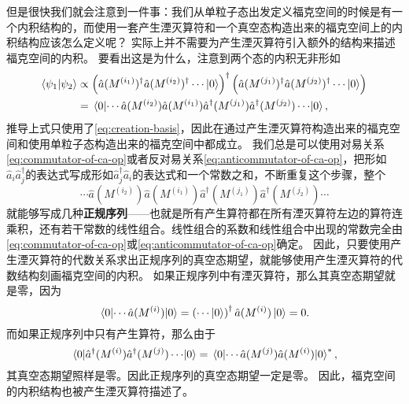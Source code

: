 \documentclass[hyperref, UTF8, a4paper]{ctexart}
\begin{document}
但是很快我们就会注意到一件事：我们从单粒子态出发定义福克空间的时候是有一个内积结构的，而使用一套产生湮灭算符和一个真空态构造出来的福克空间上的内积结构应该怎么定义呢？
实际上并不需要为产生湮灭算符引入额外的结构来描述福克空间的内积。
要看出这是为什么，注意到两个态的内积无非形如
\[
    \begin{aligned}
        \braket{\psi_1}{\psi_2} &\propto \left( \hat{a}(M^{(i_1)})^\dagger \hat{a}(M^{(i_2)})^\dagger \cdots \ket{0} \right)^\dagger \left( \hat{a}(M^{(j_1)})^\dagger \hat{a}(M^{(j_2)})^\dagger \cdots \ket{0} \right) \\
        &= \mel{0}{\cdots \hat{a}(M^{(i_2)}) \hat{a}(M^{(i_1)}) \hat{a}^\dagger(M^{(j_1)}) \hat{a}^\dagger (M^{(j_2)}) \cdots }{0},
    \end{aligned}
\]
推导上式只使用了\eqref{eq:creation-basis}，因此在通过产生湮灭算符构造出来的福克空间和使用单粒子态构造出来的福克空间中都成立。
我们总是可以使用对易关系\eqref{eq:commutator-of-ca-op}或者反对易关系\eqref{eq:anticommutator-of-ca-op}，把形如$\hat{a}_i \hat{a}^\dagger_j$的表达式写成形如$\hat{a}^\dagger_j \hat{a}_i$的表达式和一个常数之和，不断重复这个步骤，整个
\[
    \cdots \hat{a}(M^{(i_2)}) \hat{a}(M^{(i_1)}) \hat{a}^\dagger(M^{(j_1)}) \hat{a}^\dagger (M^{(j_2)}) \cdots
\]
就能够写成几种\textbf{正规序列}——也就是所有产生算符都在所有湮灭算符左边的算符连乘积，还有若干常数的线性组合。线性组合的系数和线性组合中出现的常数完全由\eqref{eq:commutator-of-ca-op}或\eqref{eq:anticommutator-of-ca-op}确定。
因此，只要使用产生湮灭算符的代数关系求出正规序列的真空态期望，就能够使用产生湮灭算符的代数结构刻画福克空间的内积。
如果正规序列中有湮灭算符，那么其真空态期望就是零，因为
\[
    \mel{0}{\cdots \hat{a}(M^{(i)})}{0} = \left( \cdots \ket{0} \right)^\dagger \hat{a}(M^{(i)}) \ket{0} = 0.
\]
而如果正规序列中只有产生算符，那么由于
\[
    \mel{0}{\hat{a}^\dagger(M^{(i)}) \hat{a}^\dagger(M^{(j)}) \cdots}{0} = \mel{0}{\cdots \hat{a}(M^{(j)}) \hat{a}(M^{(i)})}{0}^*,
\]
其真空态期望照样是零。因此正规序列的真空态期望一定是零。
因此，福克空间的内积结构也被产生湮灭算符描述了。
\end{document}
